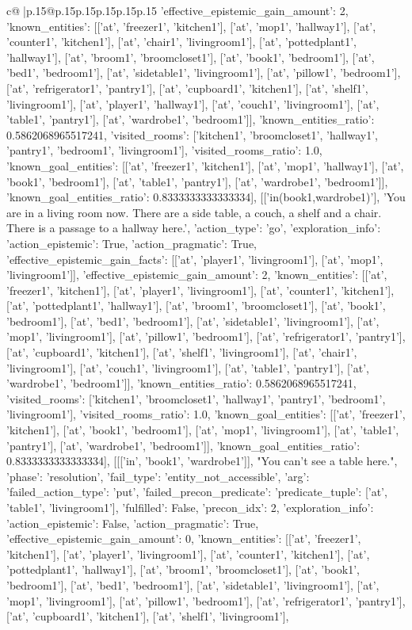 \documentclass{article}
\begin{document}
{\begin{supertabular}{c@{$\;$}|p{.15\linewidth}@{}p{.15\linewidth}p{.15\linewidth}p{.15\linewidth}p{.15\linewidth}p{.15\linewidth}}
{{{'effective_epistemic_gain_amount': 2, 'known_entities': [['at', 'freezer1', 'kitchen1'], ['at', 'mop1', 'hallway1'], ['at', 'counter1', 'kitchen1'], ['at', 'chair1', 'livingroom1'], ['at', 'pottedplant1', 'hallway1'], ['at', 'broom1', 'broomcloset1'], ['at', 'book1', 'bedroom1'], ['at', 'bed1', 'bedroom1'], ['at', 'sidetable1', 'livingroom1'], ['at', 'pillow1', 'bedroom1'], ['at', 'refrigerator1', 'pantry1'], ['at', 'cupboard1', 'kitchen1'], ['at', 'shelf1', 'livingroom1'], ['at', 'player1', 'hallway1'], ['at', 'couch1', 'livingroom1'], ['at', 'table1', 'pantry1'], ['at', 'wardrobe1', 'bedroom1']], 'known_entities_ratio': 0.5862068965517241, 'visited_rooms': ['kitchen1', 'broomcloset1', 'hallway1', 'pantry1', 'bedroom1', 'livingroom1'], 'visited_rooms_ratio': 1.0, 'known_goal_entities': [['at', 'freezer1', 'kitchen1'], ['at', 'mop1', 'hallway1'], ['at', 'book1', 'bedroom1'], ['at', 'table1', 'pantry1'], ['at', 'wardrobe1', 'bedroom1']], 'known_goal_entities_ratio': 0.8333333333333334}}], [['in(book1,wardrobe1)'], 'You are in a living room now. There are a side table, a couch, a shelf and a chair. There is a passage to a hallway here.', {'action_type': 'go', 'exploration_info': {'action_epistemic': True, 'action_pragmatic': True, 'effective_epistemic_gain_facts': [['at', 'player1', 'livingroom1'], ['at', 'mop1', 'livingroom1']], 'effective_epistemic_gain_amount': 2, 'known_entities': [['at', 'freezer1', 'kitchen1'], ['at', 'player1', 'livingroom1'], ['at', 'counter1', 'kitchen1'], ['at', 'pottedplant1', 'hallway1'], ['at', 'broom1', 'broomcloset1'], ['at', 'book1', 'bedroom1'], ['at', 'bed1', 'bedroom1'], ['at', 'sidetable1', 'livingroom1'], ['at', 'mop1', 'livingroom1'], ['at', 'pillow1', 'bedroom1'], ['at', 'refrigerator1', 'pantry1'], ['at', 'cupboard1', 'kitchen1'], ['at', 'shelf1', 'livingroom1'], ['at', 'chair1', 'livingroom1'], ['at', 'couch1', 'livingroom1'], ['at', 'table1', 'pantry1'], ['at', 'wardrobe1', 'bedroom1']], 'known_entities_ratio': 0.5862068965517241, 'visited_rooms': ['kitchen1', 'broomcloset1', 'hallway1', 'pantry1', 'bedroom1', 'livingroom1'], 'visited_rooms_ratio': 1.0, 'known_goal_entities': [['at', 'freezer1', 'kitchen1'], ['at', 'book1', 'bedroom1'], ['at', 'mop1', 'livingroom1'], ['at', 'table1', 'pantry1'], ['at', 'wardrobe1', 'bedroom1']], 'known_goal_entities_ratio': 0.8333333333333334}}], [[['in', 'book1', 'wardrobe1']], "You can't see a table here.", {'phase': 'resolution', 'fail_type': 'entity_not_accessible', 'arg': {'failed_action_type': 'put', 'failed_precon_predicate': {'predicate_tuple': ['at', 'table1', 'livingroom1'], 'fulfilled': False, 'precon_idx': 2}}, 'exploration_info': {'action_epistemic': False, 'action_pragmatic': True, 'effective_epistemic_gain_amount': 0, 'known_entities': [['at', 'freezer1', 'kitchen1'], ['at', 'player1', 'livingroom1'], ['at', 'counter1', 'kitchen1'], ['at', 'pottedplant1', 'hallway1'], ['at', 'broom1', 'broomcloset1'], ['at', 'book1', 'bedroom1'], ['at', 'bed1', 'bedroom1'], ['at', 'sidetable1', 'livingroom1'], ['at', 'mop1', 'livingroom1'], ['at', 'pillow1', 'bedroom1'], ['at', 'refrigerator1', 'pantry1'], ['at', 'cupboard1', 'kitchen1'], ['at', 'shelf1', 'livingroom1'], }}}
\end{supertabular}}
\end{document}
